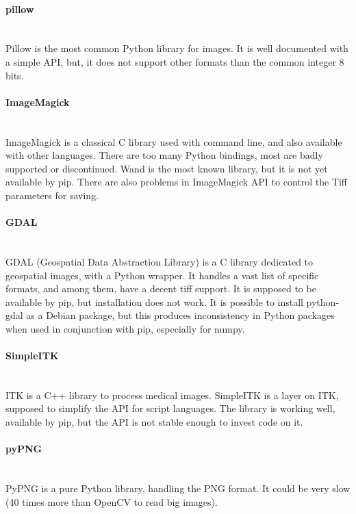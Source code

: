 \paragraph{pillow} \hspace{0pt} \\
Pillow is the most common Python library for images. It is well documented with a simple API, but, it does not support other formats than the common integer 8 bits.

\paragraph{ImageMagick} \hspace{0pt} \\
ImageMagick is a classical C library used with command line, and also available with other languages. There are too many Python bindings, most are badly supported or discontinued. Wand is the most known library, but it is not yet available by pip. There are also problems in ImageMagick API to control the Tiff parameters for saving.

\paragraph{GDAL} \hspace{0pt} \\
GDAL (Geospatial Data Abstraction Library) is a C library dedicated to geospatial images, with a Python wrapper. It handles a vast list of specific formats, and among them, have a decent tiff support. It is supposed to be available by pip, but installation does not work. It is possible to install python-gdal as a Debian package, but this produces inconsistency in Python packages when used in conjunction with pip, especially for numpy.

\paragraph{SimpleITK} \hspace{0pt} \\
ITK is a C++ library to process medical images. SimpleITK is a layer on ITK, supposed to simplify the API for script languages. The library is working well, available by pip, but the API is not stable enough to invest code on it.

\paragraph{pyPNG} \hspace{0pt} \\
PyPNG is a pure Python library, handling the PNG format. It could be very slow (40 times more than OpenCV to read big images). 

